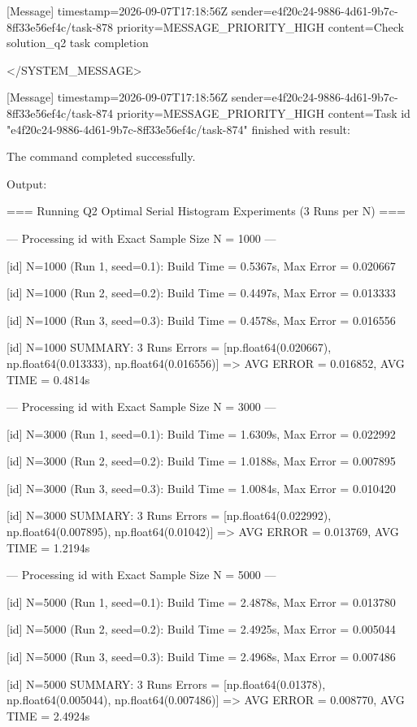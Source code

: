 \documentclass[11pt,a4paper]{article}
\begin{document}
{[Message] timestamp=2026-09-07T17:18:56Z sender=e4f20c24-9886-4d61-9b7c-8ff33e56ef4c/task-878 priority=MESSAGE\_PRIORITY\_HIGH content=Check solution\_q2 task completion

</SYSTEM\_MESSAGE>

[Message] timestamp=2026-09-07T17:18:56Z sender=e4f20c24-9886-4d61-9b7c-8ff33e56ef4c/task-874 priority=MESSAGE\_PRIORITY\_HIGH content=Task id "e4f20c24-9886-4d61-9b7c-8ff33e56ef4c/task-874" finished with result:


The command completed successfully.

Output:

=== Running Q2 Optimal Serial Histogram Experiments (3 Runs per N) ===


--- Processing id with Exact Sample Size N = 1000 ---

[id] N=1000 (Run 1, seed=0.1): Build Time = 0.5367s, Max Error = 0.020667

[id] N=1000 (Run 2, seed=0.2): Build Time = 0.4497s, Max Error = 0.013333

[id] N=1000 (Run 3, seed=0.3): Build Time = 0.4578s, Max Error = 0.016556

[id] N=1000 SUMMARY: 3 Runs Errors = [np.float64(0.020667), np.float64(0.013333), np.float64(0.016556)] => AVG ERROR = 0.016852, AVG TIME = 0.4814s


--- Processing id with Exact Sample Size N = 3000 ---

[id] N=3000 (Run 1, seed=0.1): Build Time = 1.6309s, Max Error = 0.022992

[id] N=3000 (Run 2, seed=0.2): Build Time = 1.0188s, Max Error = 0.007895

[id] N=3000 (Run 3, seed=0.3): Build Time = 1.0084s, Max Error = 0.010420

[id] N=3000 SUMMARY: 3 Runs Errors = [np.float64(0.022992), np.float64(0.007895), np.float64(0.01042)] => AVG ERROR = 0.013769, AVG TIME = 1.2194s


--- Processing id with Exact Sample Size N = 5000 ---

[id] N=5000 (Run 1, seed=0.1): Build Time = 2.4878s, Max Error = 0.013780

[id] N=5000 (Run 2, seed=0.2): Build Time = 2.4925s, Max Error = 0.005044

[id] N=5000 (Run 3, seed=0.3): Build Time = 2.4968s, Max Error = 0.007486

[id] N=5000 SUMMARY: 3 Runs Errors = [np.float64(0.01378), np.float64(0.005044), np.float64(0.007486)] => AVG ERROR = 0.008770, AVG TIME = 2.4924s


}
\end{document}
